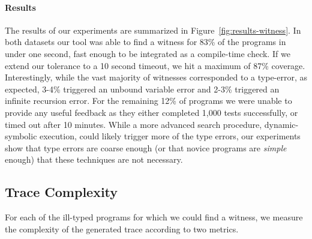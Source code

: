 \paragraph{Results}
\label{sec:results-witness}
The results of our experiments are summarized in
Figure~\ref{fig:results-witness}.
%
In both datasets our tool was able to find a witness for 83\% of the
programs in under one second, \ie fast enough to be integrated as a
compile-time check. If we extend our tolerance to a 10 second timeout,
we hit a maximum of 87\% coverage.
%
Interestingly, while the vast majority of witnesses corresponded to a
type-error, as expected, 3-4\% triggered an unbound variable error and
2-3\% triggered an infinite recursion error.
%
For the remaining 12\% of programs we were unable to provide any useful
feedback as they either completed 1,000 tests successfully, or timed out
after 10 minutes.
%
%
While a more advanced search procedure, \eg dynamic-symbolic execution,
could likely trigger more of the type errors, our experiments show that
type errors are coarse enough (or that novice programs are \emph{simple}
enough) that these techniques are not necessary.


\subsection{Trace Complexity}
\label{sec:trace-complexity}

For each of the ill-typed programs for which we could
find a witness, we measure the complexity of the generated
trace according to two metrics.

